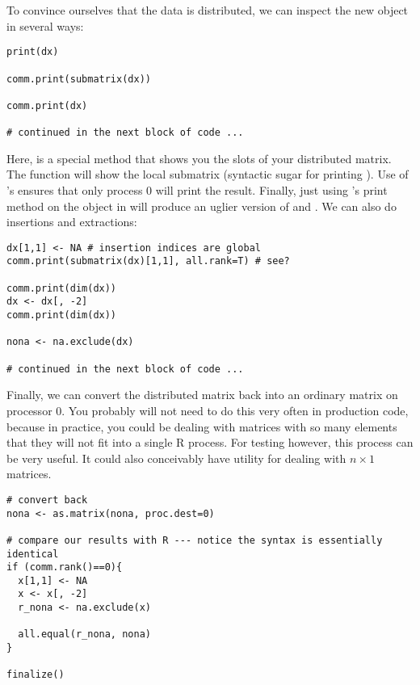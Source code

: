 To convince ourselves that the data is distributed, we can inspect the new object in several ways:

\begin{lstlisting}[language=rr,title=Printing the Object]
print(dx)

comm.print(submatrix(dx))

comm.print(dx)
 
# continued in the next block of code ...
\end{lstlisting}

Here,  is a special method that shows you the slots of your distributed matrix.  The  function will show the local submatrix (syntactic sugar for printing ).  Use of 's  ensures that only process 0 will print the result.  Finally, just using 's print method on the object in  will produce an uglier version of  and .
\np
We can also do insertions and extractions:

\begin{lstlisting}[language=rr,title=Insertion and Extraction]
dx[1,1] <- NA # insertion indices are global
comm.print(submatrix(dx)[1,1], all.rank=T) # see?

comm.print(dim(dx))
dx <- dx[, -2]
comm.print(dim(dx))

nona <- na.exclude(dx)

# continued in the next block of code ...
\end{lstlisting}

Finally, we can convert the distributed matrix back into an ordinary  matrix on processor 0.  You probably will not need to do this very often in production code, because in practice, you could be dealing with matrices with so many elements that they will not fit into a single R process.  For testing however, this process can be very useful.  It could also conceivably have utility for dealing with $n\times 1$ matrices.

\begin{lstlisting}[language=rr,title=Insertion and Extraction]
# convert back
nona <- as.matrix(nona, proc.dest=0)

# compare our results with R --- notice the syntax is essentially identical
if (comm.rank()==0){
  x[1,1] <- NA
  x <- x[, -2]
  r_nona <- na.exclude(x)
  
  all.equal(r_nona, nona)
}

finalize()
\end{lstlisting}


